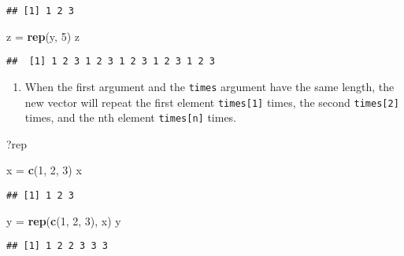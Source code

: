 \documentclass[
]{article}
\newenvironment{Shaded}{\begin{snugshade}}{\end{snugshade}}
\newcommand{\DecValTok}[1]{\textcolor[rgb]{0.00,0.00,0.81}{#1}}
\newcommand{\KeywordTok}[1]{\textcolor[rgb]{0.13,0.29,0.53}{\textbf{#1}}}
\newcommand{\NormalTok}[1]{#1}
\newcommand{\StringTok}[1]{\textcolor[rgb]{0.31,0.60,0.02}{#1}}
\providecommand{\tightlist}{%
  \setlength{\itemsep}{0pt}\setlength{\parskip}{0pt}}
\begin{document}
\begin{verbatim}
## [1] 1 2 3
\end{verbatim}

\begin{Shaded}
\begin{Highlighting}[]
\NormalTok{z =}\StringTok{ }\KeywordTok{rep}\NormalTok{(y, }\DecValTok{5}\NormalTok{)}
\NormalTok{z}
\end{Highlighting}
\end{Shaded}

\begin{verbatim}
##  [1] 1 2 3 1 2 3 1 2 3 1 2 3 1 2 3
\end{verbatim}

\begin{enumerate}
\def\labelenumi{\arabic{enumi}.}
\setcounter{enumi}{2}
\tightlist
\item
  When the first argument and the \texttt{times} argument have the same
  length, the new vector will repeat the first element
  \texttt{times{[}1{]}} times, the second \texttt{times{[}2{]}} times,
  and the nth element \texttt{times{[}n{]}} times.
\end{enumerate}

\begin{Shaded}
\begin{Highlighting}[]
\NormalTok{?rep}
\end{Highlighting}
\end{Shaded}

\begin{Shaded}
\begin{Highlighting}[]
\NormalTok{x =}\StringTok{ }\KeywordTok{c}\NormalTok{(}\DecValTok{1}\NormalTok{, }\DecValTok{2}\NormalTok{, }\DecValTok{3}\NormalTok{)}
\NormalTok{x}
\end{Highlighting}
\end{Shaded}

\begin{verbatim}
## [1] 1 2 3
\end{verbatim}

\begin{Shaded}
\begin{Highlighting}[]
\NormalTok{y =}\StringTok{ }\KeywordTok{rep}\NormalTok{(}\KeywordTok{c}\NormalTok{(}\DecValTok{1}\NormalTok{, }\DecValTok{2}\NormalTok{, }\DecValTok{3}\NormalTok{), x)}
\NormalTok{y}
\end{Highlighting}
\end{Shaded}

\begin{verbatim}
## [1] 1 2 2 3 3 3
\end{verbatim}
\end{document}
